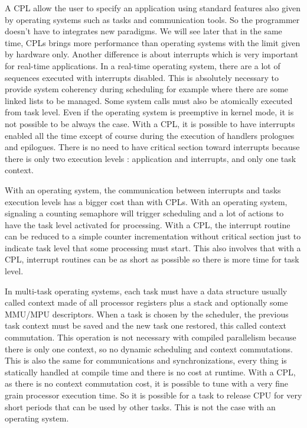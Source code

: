 \documentclass[10pt]{report}
\begin{document}
A CPL allow the user to specify an application using standard features also given by operating systems such as tasks
and communication tools. So the programmer doesn't have to integrates new paradigms. We will see later that in the same
time, CPLs brings more performance than operating systems with the limit given by hardware only. Another difference
is about interrupts which is very important for real-time applications. In a real-time operating system, there are
a lot of sequences executed with interrupts disabled. This is absolutely necessary to provide system coherency
during scheduling for example where there are some linked lists to be managed. Some system calls must also be
atomically executed from task level. Even if the operating system is preemptive in kernel mode, it is not possible
to be always the case. With a CPL, it is possible to have interrupts enabled all the time except of course during
the execution of handlers prologues and epilogues. There is no need to have critical section toward interrupts
because there is only two execution levels : application and interrupts, and only one task context.

With an operating system, the communication between interrupts and tasks execution levels has a bigger cost than with CPLs.
With an operating system, signaling a counting semaphore will trigger scheduling and a lot of actions to have the
task level activated for processing. With a CPL, the interrupt routine can be reduced to a simple counter
incrementation without critical section just to indicate task level that some processing must start. This also
involves that with a CPL, interrupt routines can be as short as possible so there is more time for task level.

In multi-task operating systems, each task must have a data structure usually called context made of all processor
registers plus a stack and optionally some MMU/MPU descriptors. When a task is chosen by the scheduler, the previous
task context must be saved and the new task one restored, this called context commutation. This operation is
not necessary with compiled parallelism because there is only one context, so no dynamic scheduling and context
commutations. This is also the same for communications and synchronizations, every thing is statically handled
at compile time and there is no cost at runtime. With a CPL, as there is no context commutation cost, it is
possible to tune with a very fine grain processor execution time. So it is possible for a task to release CPU
for very short periods that can be used by other tasks. This is not the case with an operating system.
\end{document}
